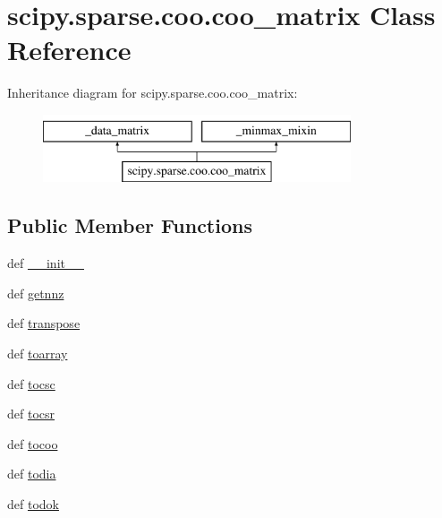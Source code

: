 \hypertarget{classscipy_1_1sparse_1_1coo_1_1coo__matrix}{}\section{scipy.\+sparse.\+coo.\+coo\+\_\+matrix Class Reference}
\label{classscipy_1_1sparse_1_1coo_1_1coo__matrix}
Inheritance diagram for scipy.\+sparse.\+coo.\+coo\+\_\+matrix\+:\begin{figure}[H]
\begin{center}
\leavevmode
\includegraphics[height=2.000000cm]{classscipy_1_1sparse_1_1coo_1_1coo__matrix}
\end{center}
\end{figure}
\subsection*{Public Member Functions}
\begin{DoxyCompactItemize}
\item 
def \hyperlink{classscipy_1_1sparse_1_1coo_1_1coo__matrix_a22ff37ecd4813d6a504442a5c26c5ada}{\+\_\+\+\_\+init\+\_\+\+\_\+}
\item 
def \hyperlink{classscipy_1_1sparse_1_1coo_1_1coo__matrix_a535d63de8a28128cee9840a472ab59b5}{getnnz}
\item 
def \hyperlink{classscipy_1_1sparse_1_1coo_1_1coo__matrix_a0bc521d5093b6b167d2a2736efc9172e}{transpose}
\item 
def \hyperlink{classscipy_1_1sparse_1_1coo_1_1coo__matrix_a1e8d33046d2e90b258e3f97bbc03b75b}{toarray}
\item 
def \hyperlink{classscipy_1_1sparse_1_1coo_1_1coo__matrix_a73b1c7e56b095dad2667f81ae0647da4}{tocsc}
\item 
def \hyperlink{classscipy_1_1sparse_1_1coo_1_1coo__matrix_a21a177c15c8468ddc79797f52dd12170}{tocsr}
\item 
def \hyperlink{classscipy_1_1sparse_1_1coo_1_1coo__matrix_a4b7cb552793f82e237b7718070c5232b}{tocoo}
\item 
def \hyperlink{classscipy_1_1sparse_1_1coo_1_1coo__matrix_afb9bf54f61c6d115d75afa94121be5e1}{todia}
\item 
def \hyperlink{classscipy_1_1sparse_1_1coo_1_1coo__matrix_a3c6f21ff58581e479b1a1f1049d16b22}{todok}
\end{DoxyCompactItemize}
